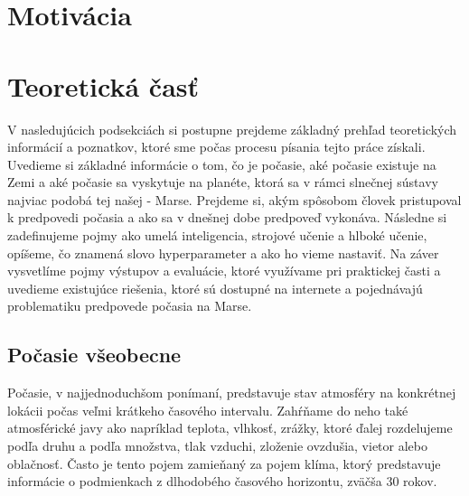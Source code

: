 
\section{Motivácia}

\section{Teoretická časť}
V nasledujúcich podsekciách si postupne prejdeme základný prehľad teoretických informácií a poznatkov, ktoré sme počas procesu písania tejto práce získali. Uvedieme si základné informácie o tom, čo je počasie, aké počasie existuje na Zemi a aké počasie sa vyskytuje na planéte, ktorá sa v rámci slnečnej sústavy najviac podobá tej našej - Marse. Prejdeme si, akým spôsobom človek pristupoval k predpovedi počasia a ako sa v dnešnej dobe predpoveď vykonáva. Následne si zadefinujeme pojmy ako umelá inteligencia, strojové učenie a hlboké učenie, opíšeme, čo znamená slovo hyperparameter a ako ho vieme nastaviť. Na záver vysvetlíme pojmy výstupov a evaluácie, ktoré využívame pri praktickej časti a uvedieme existujúce riešenia, ktoré sú dostupné na internete a pojednávajú problematiku predpovede počasia na Marse.
\subsection{Počasie všeobecne}
Počasie, v najjednoduchšom ponímaní, predstavuje stav atmosféry na konkrétnej lokácii počas veľmi krátkeho časového intervalu. Zahŕňame do neho také atmosférické javy ako napríklad teplota, vlhkosť, zrážky, ktoré ďalej rozdelujeme podľa druhu a podľa množstva, tlak vzduchi, zloženie ovzdušia, vietor alebo oblačnosť. Často je tento pojem zamieňaný za pojem klíma, ktorý predstavuje informácie o podmienkach z dlhodobého časového horizontu, zväčša 30 rokov.

